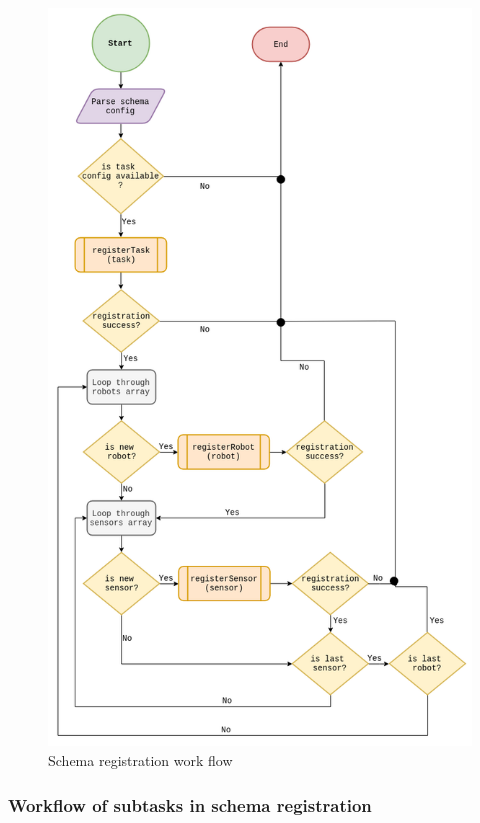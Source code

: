 	\begin{figure}[!htbp] 
		\begin{center}
			\includegraphics[scale=0.5]{./images/png/implementation/schema_registration}	
			\caption{Schema registration work flow}	
			\label{fig:schema_registration}	
		\end{center}
	\end{figure}

	\subsubsection{Workflow of subtasks in schema registration}
	
